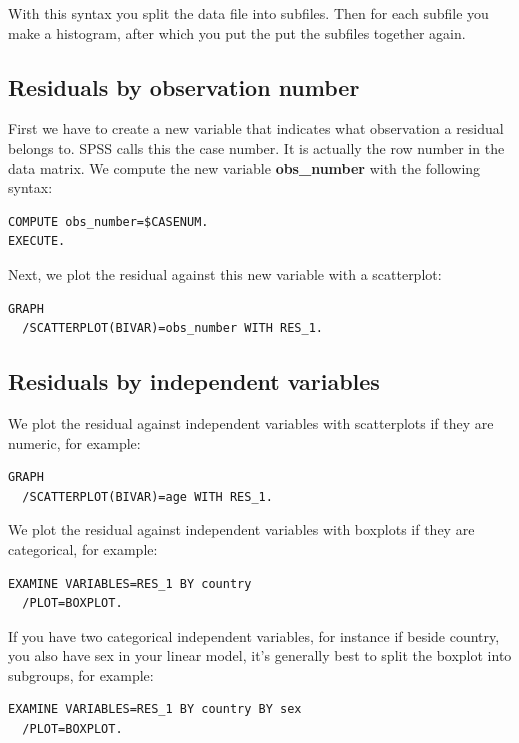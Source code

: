 \documentclass[]{book}\usepackage[]{graphicx}\usepackage[]{color}
\begin{document}
With this syntax you split the data file into subfiles. Then for each subfile you make a histogram, after which you put the put the subfiles together again. 


\subsection{Residuals by observation number}

First we have to create a new variable that indicates what observation a residual belongs to. SPSS calls this the case number. It is actually the row number in the data matrix. We compute the new variable \textbf{obs\_number} with the following syntax:
\begin{verbatim}
COMPUTE obs_number=$CASENUM.
EXECUTE.
\end{verbatim}

Next, we plot the residual against this new variable with a scatterplot:

\begin{verbatim}
GRAPH
  /SCATTERPLOT(BIVAR)=obs_number WITH RES_1.
\end{verbatim}



\subsection{Residuals by independent variables}

We plot the residual against independent variables with scatterplots if they are numeric, for example:

\begin{verbatim}
GRAPH
  /SCATTERPLOT(BIVAR)=age WITH RES_1.
\end{verbatim}


We plot the residual against independent variables with boxplots if they are categorical, for example:

\begin{verbatim}
EXAMINE VARIABLES=RES_1 BY country
  /PLOT=BOXPLOT.
\end{verbatim}

If you have two categorical independent variables, for instance if beside country, you also have sex in your linear model, it's generally best to split the boxplot into subgroups, for example:

\begin{verbatim}
EXAMINE VARIABLES=RES_1 BY country BY sex
  /PLOT=BOXPLOT.
\end{verbatim}
\end{document}
